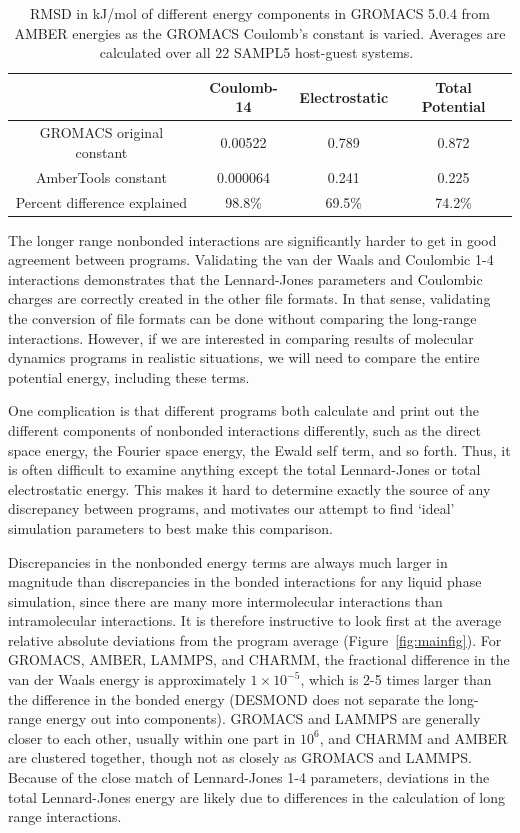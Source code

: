 \begin{table}
\caption{RMSD in kJ/mol of different energy components in GROMACS
  5.0.4 from AMBER energies as the GROMACS Coulomb's constant is
  varied. Averages are calculated over all 22 SAMPL5 host-guest
  systems.~\label{table:coulchange}}
\begin{center}
\begin{tabular}{|c|ccc|}
\hline
                          & Coulomb-14  & Electrostatic & Total Potential \\
\hline
GROMACS original constant &  0.00522    & 0.789         & 0.872  \\ 
AmberTools constant      &  0.000064   & 0.241         & 0.225 \\
Percent difference explained & 98.8\%   & 69.5\%        & 74.2\% \\  
\hline
\end{tabular}
\end{center}
\end{table}

The longer range nonbonded interactions are significantly harder to
get in good agreement between programs.  Validating the van der Waals
and Coulombic 1-4 interactions demonstrates that the Lennard-Jones
parameters and Coulombic charges are correctly created in the other
file formats.  In that sense, validating the conversion of file
formats can be done without comparing the long-range
interactions. However, if we are interested in comparing results of
molecular dynamics programs in realistic situations, we will need to
compare the entire potential energy, including these terms. 

One complication is that different programs both calculate and print
out the different components of nonbonded interactions differently,
such as the direct space energy, the Fourier space energy, the Ewald
self term, and so forth.  Thus, it is often difficult to examine
anything except the total Lennard-Jones or total electrostatic
energy. This makes it hard to determine exactly the source of any
discrepancy between programs, and motivates our attempt to find
`ideal' simulation parameters to best make this comparison.

Discrepancies in the nonbonded energy terms are always much larger in
magnitude than discrepancies in the bonded interactions for any liquid
phase simulation, since there are many more intermolecular
interactions than intramolecular interactions.  It is therefore
instructive to look first at the average relative absolute deviations
from the program average (Figure~\ref{fig:mainfig}). For GROMACS, AMBER, LAMMPS, and CHARMM, the
fractional difference in the van der Waals energy is approximately
$1\times 10^{-5}$, which is 2-5 times larger than the difference in
the bonded energy (DESMOND does not separate the long-range energy out
into components). GROMACS and LAMMPS are generally closer to each
other, usually within one part in $10^6$, and CHARMM and AMBER are
clustered together, though not as closely as GROMACS and
LAMMPS. Because of the close match of Lennard-Jones 1-4 parameters,
deviations in the total Lennard-Jones energy are likely due to
differences in the calculation of long range interactions.

